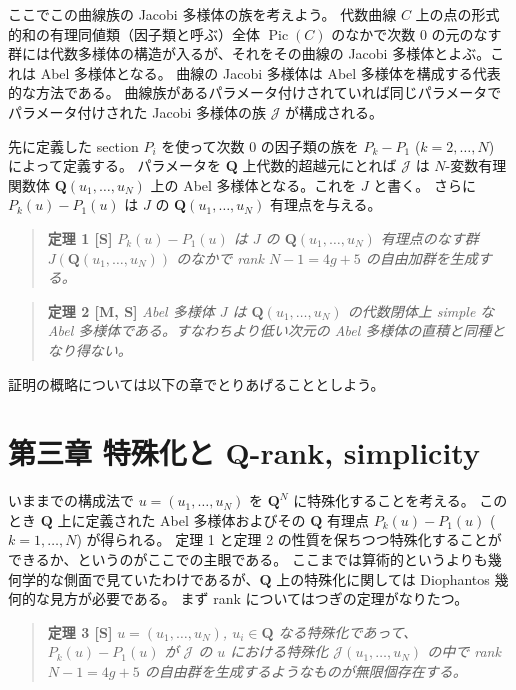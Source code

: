 \documentclass[uplatex,dvipdfmx]{jlreq}
\def\Pic{\operatorname{Pic}}
\begin{document}
ここでこの曲線族の Jacobi 多様体の族を考えよう。
代数曲線 $C$ 上の点の形式的和の有理同値類（因子類と呼ぶ）全体 $\Pic(C)$ のなかで次数 $0$ の元のなす群には代数多様体の構造が入るが、それをその曲線の Jacobi 多様体とよぶ。これは Abel 多様体となる。
曲線の Jacobi 多様体は Abel 多様体を構成する代表的な方法である。
曲線族があるパラメータ付けされていれば同じパラメータでパラメータ付けされた Jacobi 多様体の族 $\mathcal{J}$ が構成される。

先に定義した section $P_i$ を使って次数 $0$ の因子類の族を $P_k - P_1$ ($k = 2, \dots, N$) によって定義する。
パラメータを $\mathbf{Q}$ 上代数的超越元にとれば $\mathcal{J}$ は $N$-変数有理関数体 $\mathbf{Q}(u_1, \dots, u_N)$ 上の Abel 多様体となる。これを $J$ と書く。
さらに $P_k(u) - P_1(u)$ は $J$ の $\mathbf{Q}(u_1, \dots, u_N)$ 有理点を与える。

\begin{quote}
\textbf{定理 1 [S]}\quad
\textit{$P_k(u) - P_1(u)$ は $J$ の $\mathbf{Q}(u_1, \dots, u_N)$ 有理点のなす群 $J(\mathbf{Q}(u_1, \dots, u_N))$ のなかで rank $N - 1 = 4g + 5$ の自由加群を生成する。}
\end{quote}

\begin{quote}
\textbf{定理 2 [M, S]}\quad
\textit{Abel 多様体 $J$ は $\mathbf{Q}(u_1, \dots, u_N)$ の代数閉体上 simple な Abel 多様体である。すなわちより低い次元の Abel 多様体の直積と同種となり得ない。}
\end{quote}

証明の概略については以下の章でとりあげることとしよう。


\section*{第三章 特殊化と $\mathbf{Q}$-rank, simplicity}

いままでの構成法で $u = (u_1, \dots, u_N)$ を $\mathbf{Q}^N$ に特殊化することを考える。
このとき $\mathbf{Q}$ 上に定義された Abel 多様体およびその $\mathbf{Q}$ 有理点 $P_k(u) - P_1(u)$ ($k = 1, \dots, N$) が得られる。
定理 1 と定理 2 の性質を保ちつつ特殊化することができるか、というのがここでの主眼である。
ここまでは算術的というよりも幾何学的な側面で見ていたわけであるが、$\mathbf{Q}$ 上の特殊化に関しては Diophantos 幾何的な見方が必要である。
まず rank についてはつぎの定理がなりたつ。

\begin{quote}
\textbf{定理 3 [S]}\quad
\textit{$u = (u_1, \dots, u_N)$, $u_i \in \mathbf{Q}$ なる特殊化であって、$P_k(u) - P_1(u)$ が $\mathcal{J}$ の $u$ における特殊化 $\mathcal{J}(u_1, \dots, u_N)$ の中で rank $N - 1 = 4g + 5$ の自由群を生成するようなものが無限個存在する。}
\end{quote}
\end{document}
